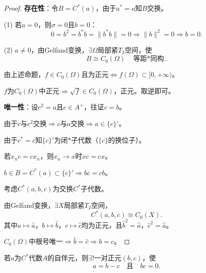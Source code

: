 \documentclass[lang=cn,a4paper,newtx,section]{elegantbook}
\begin{document}
\begin{proof}
  \textbf{存在性}：令$B = C^*(a)$，由于$a^* = a$知$B$交换。
  
  (1) 若$a = 0$，则$\sigma = 0$且$b = 0$：
  \begin{equation*}
    0 = b^2 = b^*b = \|b^*b\| = 0 \Rightarrow \|b\|^2 = 0 \Rightarrow b = 0.
  \end{equation*}
  
  (2) $a \neq 0$，由Gelfand变换，$\exists \Omega$局部紧$T_2$空间，使
  \begin{equation*}
    B \cong C_0(\Omega) \quad \text{等距$*$同构}.
  \end{equation*}
  
  由上述命题，$f \in C_0(\Omega)$且为正元$\Longleftrightarrow f(\Omega) \subset [0, +\infty)$。
  
  $f$为$C_0(\Omega)$中正元$\Rightarrow \sqrt{f} \in C_0(\Omega)$，正元。取逆即可。
  
  \textbf{唯一性}：设$c^2 = a$且$c \in A^+$，往证$c = b$。
  
  由于$c$与$c^2$交换$\Rightarrow c$与$a$交换$\Rightarrow a \in \{c\}'$。
  
  由于$c^* = c$知$\{c\}'$为闭$*$子代数（$\{c\}$的换位子）。
  
  若$x_n c = c x_n$，则$x_n \to x$时$xc = cx$。
  
  $b \in B = C^*(a) \subset \{c\}' \Rightarrow bc = cb$。
  
  考虑$C^*(a, b, c)$为交换$C^*$子代数。
  
  由Gelfand变换，$\exists X$局部紧$T_2$空间，
  \begin{equation*}
    C^*(a, b, c) \cong C_0(X).
  \end{equation*}
  其中$a \mapsto \hat{a}$，$b \mapsto \hat{b}$，$c \mapsto \hat{c}$均为正元，且$\hat{b}^2 = \hat{a}$，$\hat{c}^2 = \hat{a}$。
  
  $C_0(\Omega)$中根号唯一$\Rightarrow \hat{b} = \hat{c} \Rightarrow b = c$。
\end{proof}

\begin{proposition}
  若$a$为$C^*$代数$A$的自伴元，则$\exists!$一对正元$(b, c)$，使
  \begin{equation*}
    a = b - c \quad \text{且} \quad bc = 0.
  \end{equation*}
\end{proposition}
\end{document}
